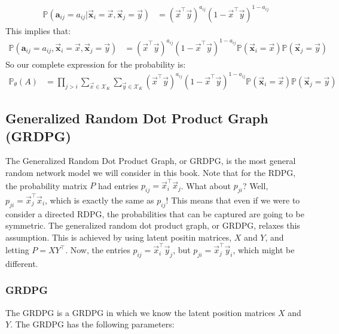 \documentclass[letterpaper,10pt,english]{jupyterBook}
\begin{document}
\begin{align*}
\mathbb P(\mathbf a_{ij} = a_{ij}| \vec{\mathbf x}_i = \vec x, \vec{\mathbf x}_j = \vec y) &= (\vec x^\top \vec y)^{a_{ij}}(1 - \vec x^\top\vec y)^{1 - a_{ij}}
\end{align*}
\sphinxAtStartPar
This implies that:
\begin{align*}
\mathbb P(\mathbf a_{ij} = a_{ij}, \vec{\mathbf x}_i = \vec x, \vec{\mathbf x}_j = \vec y) &=  (\vec x^\top \vec y)^{a_{ij}}(1 - \vec x^\top\vec y)^{1 - a_{ij}}\mathbb P(\vec{\mathbf x}_i = \vec x) \mathbb P(\vec{\mathbf x}_j = \vec y)
\end{align*}
\sphinxAtStartPar
So our complete expression for the probability is:
\begin{align*}
\mathbb P_\theta(A) &= \prod_{j > i}\sum_{\vec x \in \mathcal X_K}\sum_{\vec y \in \mathcal X_K} (\vec x^\top \vec y)^{a_{ij}}(1 - \vec x^\top\vec y)^{1 - a_{ij}}\mathbb P(\vec{\mathbf x}_i = \vec x) \mathbb P(\vec{\mathbf x}_j = \vec y)
\end{align*}

\subsection{Generalized Random Dot Product Graph (GRDPG)}
\label{\detokenize{representations/ch5/single-network-models_theory:generalized-random-dot-product-graph-grdpg}}
\sphinxAtStartPar
The Generalized Random Dot Product Graph, or GRDPG, is the most general random network model we will consider in this book. Note that for the RDPG, the probability matrix \(P\) had entries \(p_{ij} = \vec x_i^\top \vec x_j\). What about \(p_{ji}\)? Well, \(p_{ji} = \vec x_j^\top \vec x_i\), which is exactly the same as \(p_{ij}\)! This means that even if we were to consider a directed RDPG, the probabilities that can be captured are  going to be symmetric. The generalized random dot product graph, or GRDPG, relaxes this assumption. This is achieved by using  latent positin matrices, \(X\) and \(Y\), and letting \(P = X Y^\top\). Now, the entries \(p_{ij} = \vec x_i^\top \vec y_j\), but \(p_{ji} = \vec x_j^\top \vec y_i\), which might be different.


\subsubsection{ GRDPG}
\label{\detokenize{representations/ch5/single-network-models_theory:a-priori-grdpg}}
\sphinxAtStartPar
The  GRDPG is a GRDPG in which we know  the latent position matrices \(X\) and \(Y\). The  GRDPG has the following parameters:
\end{document}
